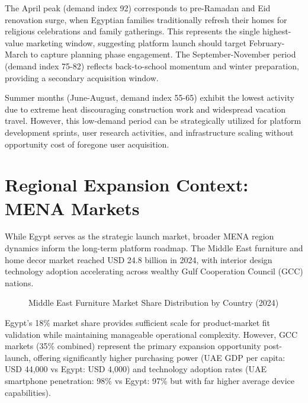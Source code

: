 The April peak (demand index 92) corresponds to pre-Ramadan and Eid renovation surge, when Egyptian families traditionally refresh their homes for religious celebrations and family gatherings. This represents the single highest-value marketing window, suggesting platform launch should target February-March to capture planning phase engagement. The September-November period (demand index 75-82) reflects back-to-school momentum and winter preparation, providing a secondary acquisition window.

Summer months (June-August, demand index 55-65) exhibit the lowest activity due to extreme heat discouraging construction work and widespread vacation travel. However, this low-demand period can be strategically utilized for platform development sprints, user research activities, and infrastructure scaling without opportunity cost of foregone user acquisition.

\section{Regional Expansion Context: MENA Markets}
\label{sec:app_mena}

While Egypt serves as the strategic launch market, broader MENA region dynamics inform the long-term platform roadmap. The Middle East furniture and home decor market reached USD 24.8 billion in 2024, with interior design technology adoption accelerating across wealthy Gulf Cooperation Council (GCC) nations.

\begin{figure}[htbp]
\centering
{}
\caption{Middle East Furniture Market Share Distribution by Country (2024)}
\label{fig:mena_distribution}
\end{figure}

Egypt's 18\% market share provides sufficient scale for product-market fit validation while maintaining manageable operational complexity. However, GCC markets (35\% combined) represent the primary expansion opportunity post-launch, offering significantly higher purchasing power (UAE GDP per capita: USD 44,000 vs Egypt: USD 4,000) and technology adoption rates (UAE smartphone penetration: 98\% vs Egypt: 97\% but with far higher average device capabilities).

